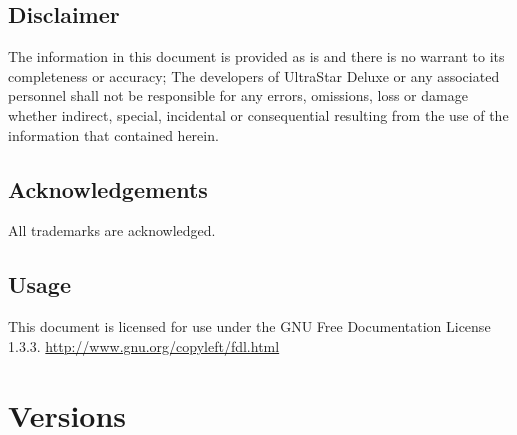 \documentclass{scrreprt}
\begin{document}
\subsection{Disclaimer}
The information in this document is provided as is
and there is no warrant to its completeness or accuracy;
The developers of UltraStar Deluxe or any associated personnel
shall not be responsible for any errors, omissions, loss or damage
whether indirect, special, incidental or consequential
resulting from the use of the information that contained herein.

\subsection{Acknowledgements}
All trademarks are acknowledged.

\subsection{Usage}
This document is licensed for use
under the GNU Free Documentation License 1.3.3.
\url{http://www.gnu.org/copyleft/fdl.html}

\section{Versions}
\end{document}
